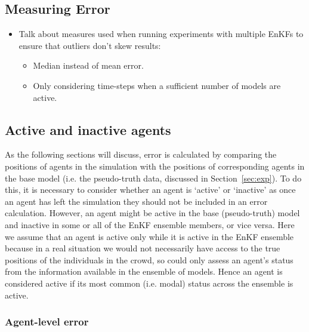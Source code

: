\documentclass{article}
\begin{document}
\subsection{Measuring Error}\label{sec:error}

\begin{itemize}
    \item Talk about measures used when running experiments with multiple EnKFs
        to ensure that outliers don't skew results:
    \begin{itemize}
        \item Median instead of mean error.
        \item Only considering time-steps when a sufficient number of models are
            active.
    \end{itemize}
\end{itemize}

\subsection{Active and inactive agents}

As the following sections will discuss, error is calculated by comparing the positions of agents in the simulation with the positions of corresponding agents in the base model (i.e. the pseudo-truth data, discussed in Section~\ref{sec:exp}). To do this, it is necessary to consider whether an agent is `active' 
or `inactive' as once an agent has left the simulation they should not be included in an error calculation. However, an agent might be active in the base (pseudo-truth) model and inactive in some or all of the EnKF ensemble members, or vice versa.  
Here we assume that an agent is active only while it is active in the EnKF ensemble  because in a real situation we would not necessarily have access to the true positions of the individuals in the crowd, so could only assess an agent's status from the information available in the ensemble of models. Hence an agent is considered active if its most common (i.e. modal) status across the ensemble is active.

\subsubsection{Agent-level error}
\end{document}
